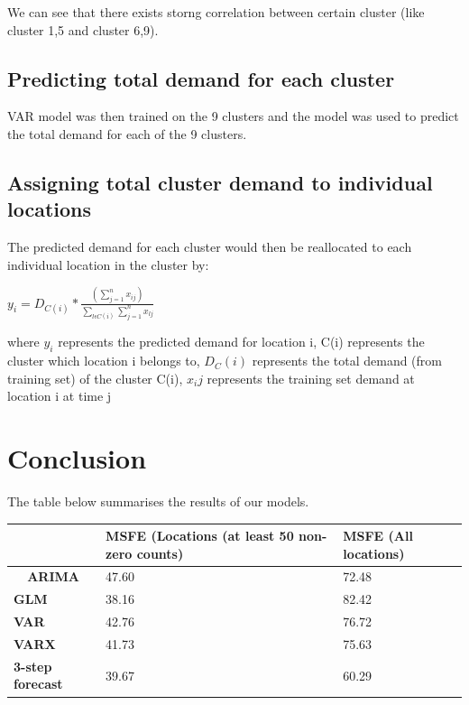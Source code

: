 \documentclass[12pt, letterpaper] {article}
\begin{document}
We can see that there exists storng correlation between certain cluster (like cluster 1,5 and cluster 6,9). 

\subsection{Predicting total demand for each cluster}

VAR model was then trained on the 9 clusters and the model was used to predict the total demand for each of the 9 clusters. 

\subsection{Assigning total cluster demand to individual locations}

The predicted demand for each cluster would then be reallocated to each individual location in the cluster by:

\begin{center}
    $\displaystyle y_{i} = D_{C(i)} * \frac{(\sum_{j=1}^{n}x_{ij})}{\sum_{l\epsilon C(i)}\sum_{j=1}^{n}x_{lj}}$
\end{center}

\noindent where $y_i$ represents the predicted demand for location i, C(i) represents the cluster which location i belongs to, $D_C(i)$ represents the total demand (from training set) of the cluster C(i), $x_ij$ represents the training set demand at location i at time j

\section{Conclusion}
The table below summarises the results of our models. 

\begin{table}[H]
\begin{tabular}{|l|l|l|}
\hline
                                     & \textbf{MSFE (Locations (at least 50 non-zero counts)} & \textbf{MSFE (All locations)} \\ \hline
\multicolumn{1}{|c|}{\textbf{ARIMA}} & 47.60                                                      & 72.48                        \\ \hline
\textbf{GLM}                         & 38.16                                                      & 82.42                         \\ \hline
\textbf{VAR}                         & 42.76                                                      & 76.72                         \\ \hline
\textbf{VARX}                        & 41.73                                                      & 75.63                        \\ \hline
\textbf{3-step forecast}                        & 39.67 & 60.29                     \\ \hline
\end{tabular}
\end{table}
\end{document}
